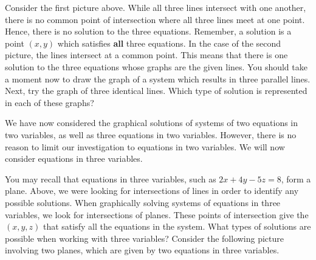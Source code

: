 \begin{center}
\par{}\label{fig:systemsofequationsGeometry-tikz03}%

\end{center}

Consider the first picture above. While all three lines intersect with one another, there is no common point of intersection
where all three lines meet at one point. Hence, there is no solution to the three equations. Remember, a solution is a point $\left( x, y \right)$
which satisfies \textbf{all} three equations.
In the case of the second picture, the lines intersect at a common point. This means that there is one solution to the three equations whose graphs are the
given lines. 
You should take a moment now to draw the graph of a system which results in three parallel lines. Next, try the graph of three identical lines.  Which type of solution is represented in each of these graphs?

We have now considered the graphical solutions of systems of two equations in two variables, as well as three equations in two variables. However, there is no reason to limit our investigation to equations in two variables. We will now consider equations in three variables.

You may recall that equations in three variables, such as $2x+4y-5z=8$, form a plane. Above, we were looking for intersections of lines in order to 
identify any possible solutions. When graphically solving systems of equations in three variables, we look for 
intersections of planes. These points of intersection give the $\left( x, y, z \right)$ that satisfy all the equations 
in the system.  What types of solutions are possible when working with three variables?
 Consider the following picture involving two planes, which are given by two 
equations in three variables.

